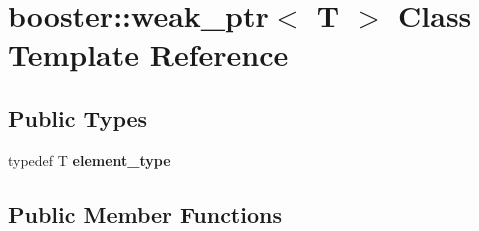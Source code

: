 \section{booster\-:\-:weak\-\_\-ptr$<$ T $>$ Class Template Reference}
\label{classbooster_1_1weak__ptr}
\subsection*{Public Types}
\begin{DoxyCompactItemize}
\item 
typedef T {\bfseries element\-\_\-type}\label{classbooster_1_1weak__ptr_a07c8444ff0fcb1e509436c32728e6268}

\end{DoxyCompactItemize}
\subsection*{Public Member Functions}
